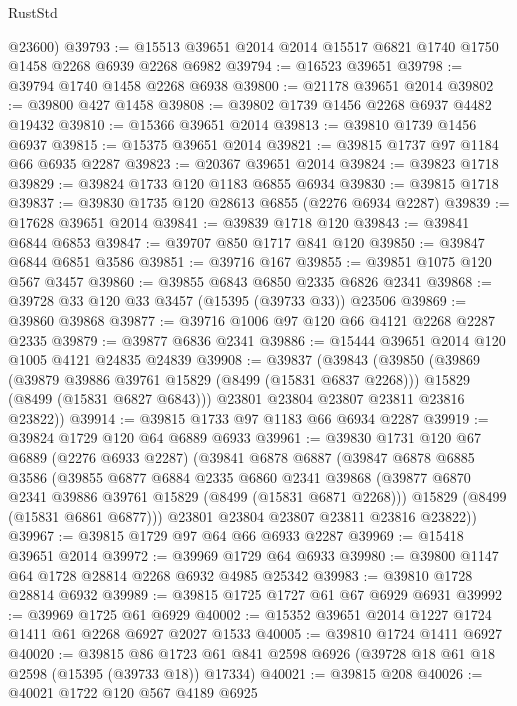 \begin{lexlean}{RustStd}
\begin{coremodule}
      @23600)
@39793 := @15513 @39651 @2014 @2014 @15517 @6821 @1740 @1750 @1458 @2268 @6939 @2268 @6982
@39794 := @16523 @39651
@39798 := @39794 @1740 @1458 @2268 @6938
@39800 := @21178 @39651 @2014
@39802 := @39800 @427 @1458
@39808 := @39802 @1739 @1456 @2268 @6937 @4482 @19432
@39810 := @15366 @39651 @2014
@39813 := @39810 @1739 @1456 @6937
@39815 := @15375 @39651 @2014
@39821 := @39815 @1737 @97 @1184 @66 @6935 @2287
@39823 := @20367 @39651 @2014
@39824 := @39823 @1718
@39829 := @39824 @1733 @120 @1183 @6855 @6934
@39830 := @39815 @1718
@39837 := @39830 @1735 @120 @28613 @6855 (@2276 @6934 @2287)
@39839 := @17628 @39651 @2014
@39841 := @39839 @1718 @120
@39843 := @39841 @6844 @6853
@39847 := @39707 @850 @1717 @841 @120
@39850 := @39847 @6844 @6851 @3586
@39851 := @39716 @167
@39855 := @39851 @1075 @120 @567 @3457
@39860 := @39855 @6843 @6850 @2335 @6826 @2341
@39868 := @39728 @33 @120 @33 @3457 (@15395 (@39733 @33)) @23506
@39869 := @39860 @39868
@39877 := @39716 @1006 @97 @120 @66 @4121 @2268 @2287 @2335
@39879 := @39877 @6836 @2341
@39886 := @15444 @39651 @2014 @120 @1005 @4121 @24835 @24839
@39908 := @39837
    (@39843
      (@39850
        (@39869
          (@39879 @39886 @39761 @15829 (@8499 (@15831 @6837 @2268)))
          @15829
          (@8499 (@15831 @6827 @6843)))
        @23801
        @23804
        @23807
        @23811
        @23816
        @23822))
@39914 := @39815 @1733 @97 @1183 @66 @6934 @2287
@39919 := @39824 @1729 @120 @64 @6889 @6933
@39961 := @39830
    @1731
    @120
    @67
    @6889
    (@2276 @6933 @2287)
    (@39841
      @6878
      @6887
      (@39847
        @6878
        @6885
        @3586
        (@39855
          @6877
          @6884
          @2335
          @6860
          @2341
          @39868
          (@39877 @6870 @2341 @39886 @39761 @15829 (@8499 (@15831 @6871 @2268)))
          @15829
          (@8499 (@15831 @6861 @6877)))
        @23801
        @23804
        @23807
        @23811
        @23816
        @23822))
@39967 := @39815 @1729 @97 @64 @66 @6933 @2287
@39969 := @15418 @39651 @2014
@39972 := @39969 @1729 @64 @6933
@39980 := @39800 @1147 @64 @1728 @28814 @2268 @6932 @4985 @25342
@39983 := @39810 @1728 @28814 @6932
@39989 := @39815 @1725 @1727 @61 @67 @6929 @6931
@39992 := @39969 @1725 @61 @6929
@40002 := @15352 @39651 @2014 @1227 @1724 @1411 @61 @2268 @6927 @2027 @1533
@40005 := @39810 @1724 @1411 @6927
@40020 := @39815
    @86
    @1723
    @61
    @841
    @2598
    @6926
    (@39728 @18 @61 @18 @2598 (@15395 (@39733 @18)) @17334)
@40021 := @39815 @208
@40026 := @40021 @1722 @120 @567 @4189 @6925

\end{coremodule}
\end{lexlean}
